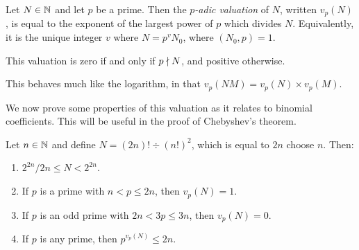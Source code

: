 \documentclass{article}
\begin{document}
\begin{definition}
    Let $N \in \mathbb{N}$ and let $p$ be a prime. Then the $p$\textit{-adic valuation} of $N$, written $v_p(N)$, is equal to the exponent of the largest power of $p$ which divides $N$. Equivalently, it is the unique integer $v$ where $N = p^vN_0$, where $(N_0, p) = 1$.
    
    This valuation is zero if and only if $p \nmid N$, and positive otherwise.
\end{definition}

\begin{corollary}
    This behaves much like the logarithm, in that $v_p(NM) = v_p(N) \times v_p(M)$.
\end{corollary}

We now prove some properties of this valuation as it relates to binomial coefficients. This will be useful in the proof of Chebyshev's theorem.

\begin{proposition}
	\label{valuation-bound-binomial}
    Let $n \in \mathbb{N}$ and define $N = (2n)! \div (n!)^2$, which is equal to $2n$ choose $n$. Then:
    \begin{enumerate}
	    \item $2^{2n} / 2n \leq N < 2^{2n}$.
	    \item If $p$ is a prime with $n < p \leq 2n$, then $v_p(N) = 1$.
	    \item If $p$ is an odd prime with $2n < 3p \leq 3n$, then $v_p(N) = 0$.
	    \item If $p$ is any prime, then $p^{v_p(N)} \leq 2n$.
	\end{enumerate}
\end{proposition}
\end{document}
